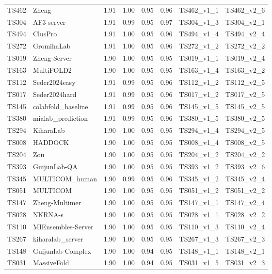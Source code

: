 \begin{longtable}{llllllll}
TS462 & Zheng & 1.91 & 1.00 & 0.95 & 0.96 & TS462\_v1\_1 & TS462\_v2\_6 \\ 
TS304 & AF3-server & 1.91 & 0.99 & 0.95 & 0.97 & TS304\_v1\_3 & TS304\_v2\_1 \\ 
TS494 & ClusPro & 1.91 & 1.00 & 0.95 & 0.96 & TS494\_v1\_4 & TS494\_v2\_4 \\ 
TS272 & GromihaLab & 1.91 & 1.00 & 0.95 & 0.96 & TS272\_v1\_2 & TS272\_v2\_2 \\ 
TS019 & Zheng-Server & 1.90 & 1.00 & 0.95 & 0.95 & TS019\_v1\_1 & TS019\_v2\_4 \\ 
TS163 & MultiFOLD2 & 1.90 & 1.00 & 0.95 & 0.95 & TS163\_v1\_4 & TS163\_v2\_2 \\ 
TS112 & Seder2024easy & 1.91 & 0.99 & 0.95 & 0.96 & TS112\_v1\_2 & TS112\_v2\_5 \\ 
TS017 & Seder2024hard & 1.91 & 0.99 & 0.95 & 0.96 & TS017\_v1\_2 & TS017\_v2\_5 \\ 
TS145 & colabfold\_baseline & 1.91 & 0.99 & 0.95 & 0.96 & TS145\_v1\_5 & TS145\_v2\_5 \\ 
TS380 & mialab\_prediction & 1.91 & 0.99 & 0.95 & 0.96 & TS380\_v1\_5 & TS380\_v2\_5 \\ 
TS294 & KiharaLab & 1.90 & 1.00 & 0.95 & 0.95 & TS294\_v1\_4 & TS294\_v2\_5 \\ 
TS008 & HADDOCK & 1.90 & 1.00 & 0.95 & 0.95 & TS008\_v1\_4 & TS008\_v2\_5 \\ 
TS204 & Zou & 1.90 & 1.00 & 0.95 & 0.95 & TS204\_v1\_2 & TS204\_v2\_2 \\ 
TS393 & GuijunLab-QA & 1.90 & 1.00 & 0.95 & 0.95 & TS393\_v1\_2 & TS393\_v2\_6 \\ 
TS345 & MULTICOM\_human & 1.90 & 0.99 & 0.95 & 0.96 & TS345\_v1\_2 & TS345\_v2\_4 \\ 
TS051 & MULTICOM & 1.90 & 1.00 & 0.95 & 0.95 & TS051\_v1\_2 & TS051\_v2\_2 \\ 
TS147 & Zheng-Multimer & 1.90 & 1.00 & 0.95 & 0.95 & TS147\_v1\_1 & TS147\_v2\_4 \\ 
TS028 & NKRNA-s & 1.90 & 1.00 & 0.95 & 0.95 & TS028\_v1\_1 & TS028\_v2\_2 \\ 
TS110 & MIEnsembles-Server & 1.90 & 1.00 & 0.95 & 0.95 & TS110\_v1\_3 & TS110\_v2\_4 \\ 
TS267 & kiharalab\_server & 1.90 & 1.00 & 0.95 & 0.95 & TS267\_v1\_3 & TS267\_v2\_3 \\ 
TS148 & Guijunlab-Complex & 1.90 & 1.00 & 0.94 & 0.95 & TS148\_v1\_1 & TS148\_v2\_1 \\ 
TS031 & MassiveFold & 1.90 & 1.00 & 0.94 & 0.95 & TS031\_v1\_5 & TS031\_v2\_3 \\ 

\end{longtable}
